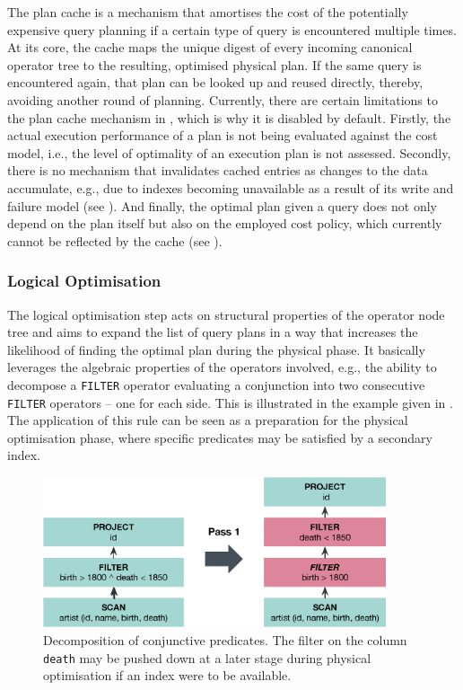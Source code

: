 The plan cache is a mechanism that amortises the cost of the potentially expensive query planning if a certain type of query is encountered multiple times. At its core, the cache maps the unique digest of every incoming canonical operator tree to the resulting, optimised physical plan. If the same query is encountered again, that plan can be looked up and reused directly, thereby, avoiding another round of planning. Currently, there are certain limitations to the plan cache mechanism in \cottontail{}, which is why it is disabled by default. Firstly, the actual execution performance of a plan is not being evaluated against the cost model, i.e., the level of optimality of an execution plan is not assessed. Secondly, there is no mechanism that invalidates cached entries as changes to the data accumulate, e.g., due to indexes becoming unavailable as a result of its write and failure model (see ). And finally, the optimal plan given a query does not only depend on the plan itself but also on the employed cost policy, which currently cannot be reflected by the cache (see ).

\subsubsection{Logical Optimisation}

The logical optimisation step acts on structural properties of the operator node tree and aims to expand the list of query plans in a way that increases the likelihood of finding the optimal plan during the physical phase. It basically leverages the algebraic properties of the operators involved, e.g., the ability to decompose a  \texttt{FILTER} operator evaluating a conjunction into two consecutive \texttt{FILTER} operators -- one for each side. This is illustrated in the example given in . The application of this rule can be seen as a preparation for the physical optimisation phase, where specific predicates may be satisfied by a secondary index.

\begin{figure}[bt]
    \centering
    \includegraphics[width=0.9\textwidth]{figures/logical-rule-conjunction}
    \caption{Decomposition of conjunctive predicates. The filter on the column \texttt{death} may be pushed down at a later stage during physical optimisation if an index were to be available.}
    \label{figure:cottontail_logical_rule_conjunction}
\end{figure}

